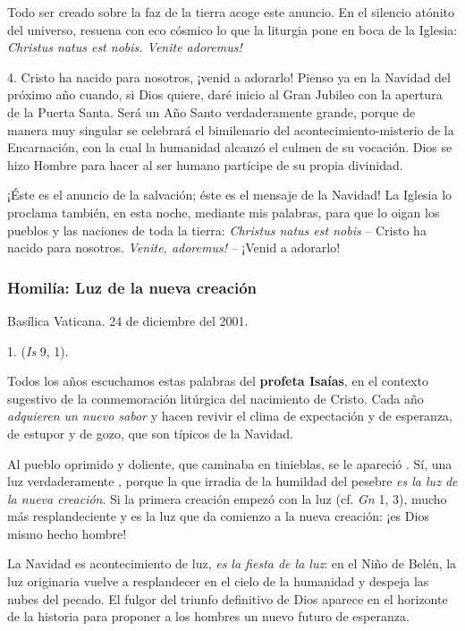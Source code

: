 \begin{body}
\begin{body}
Todo ser creado sobre la faz de la tierra acoge este anuncio. En el silencio atónito del universo, resuena con eco cósmico lo que la liturgia pone en boca de la Iglesia: \emph{Christus natus est nobis. Venite adoremus!}

4. Cristo ha nacido para nosotros, ¡venid a adorarlo! Pienso ya en la Navidad del próximo año cuando, si Dios quiere, daré inicio al Gran Jubileo con la apertura de la Puerta Santa. Será un Año Santo verdaderamente grande, porque de manera muy singular se celebrará el bimilenario del acontecimiento-misterio de la Encarnación, con la cual la humanidad alcanzó el culmen de su vocación. Dios se hizo Hombre para hacer al ser humano partícipe de su propia divinidad.

¡Éste es el anuncio de la salvación; éste es el mensaje de la Navidad! La Iglesia lo proclama también, en esta noche, mediante mis palabras, para que lo oigan los pueblos y las naciones de toda la tierra: \emph{Christus natus est nobis} -- Cristo ha nacido para nosotros. \emph{Venite, adoremus!} -- ¡Venid a adorarlo!

\subsubsection{Homilía: Luz de la nueva creación}

Basílica Vaticana. 24 de diciembre del 2001.

1. \emph{} (\emph{Is} 9, 1).

Todos los años escuchamos estas palabras del \textbf{profeta Isaías}, en el contexto sugestivo de la conmemoración litúrgica del nacimiento de Cristo. Cada año \emph{adquieren un nuevo sabor} y hacen revivir el clima de expectación y de esperanza, de estupor y de gozo, que son típicos de la Navidad.

Al pueblo oprimido y doliente, que caminaba en tinieblas, se le apareció . Sí, una luz verdaderamente , porque la que irradia de la humildad del pesebre \emph{es la luz de la nueva creación}. Si la primera creación empezó con la luz (cf. \emph{Gn} 1, 3), mucho más resplandeciente y  es la luz que da comienzo a la nueva creación: ¡es Dios mismo hecho hombre!

La Navidad es acontecimiento de luz, \emph{es la fiesta de la luz}: en el Niño de Belén, la luz originaria vuelve a resplandecer en el cielo de la humanidad y despeja las nubes del pecado. El fulgor del triunfo definitivo de Dios aparece en el horizonte de la historia para proponer a los hombres un nuevo futuro de esperanza.


\end{body}
\end{body}
